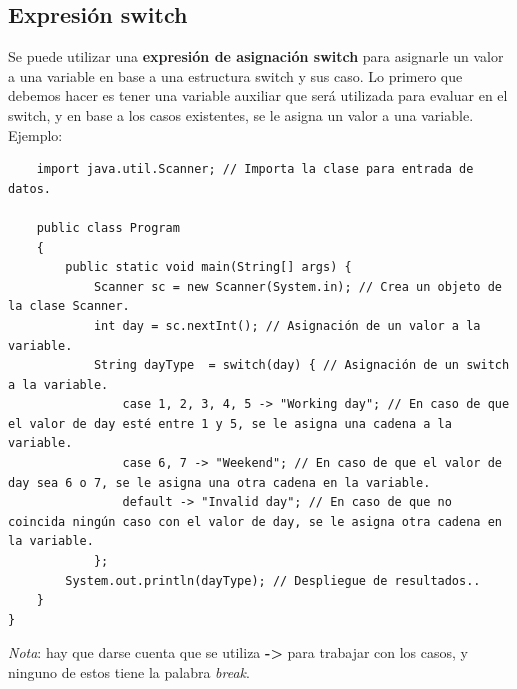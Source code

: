 \subsection{Expresión switch}
\hspace{0.55cm}Se puede utilizar una \textbf{expresión de asignación switch} para asignarle un valor a una variable en base a una estructura switch y sus caso. Lo primero que debemos hacer es tener una variable auxiliar que será utilizada para evaluar en el switch, y en base a los casos existentes, se le asigna un valor a una variable. Ejemplo:
\begin{lstlisting}
    import java.util.Scanner; // Importa la clase para entrada de datos.
    
    public class Program
    {
        public static void main(String[] args) {
            Scanner sc = new Scanner(System.in); // Crea un objeto de la clase Scanner.
            int day = sc.nextInt(); // Asignación de un valor a la variable.
            String dayType  = switch(day) { // Asignación de un switch a la variable.
                case 1, 2, 3, 4, 5 -> "Working day"; // En caso de que el valor de day esté entre 1 y 5, se le asigna una cadena a la variable.
                case 6, 7 -> "Weekend"; // En caso de que el valor de day sea 6 o 7, se le asigna una otra cadena en la variable.
                default -> "Invalid day"; // En caso de que no coincida ningún caso con el valor de day, se le asigna otra cadena en la variable.
            };
        System.out.println(dayType); // Despliegue de resultados..
    }
} 
\end{lstlisting}

\textit{Nota}: hay que darse cuenta que se utiliza \textbf{->} para trabajar con los casos, y ninguno de estos tiene la palabra \textit{break}.